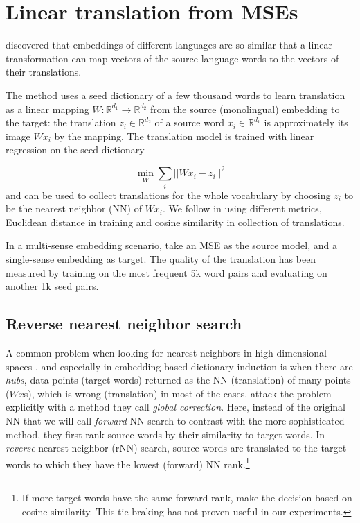 \documentclass[11pt]{article}
\newcommand{\Ro}{\mathbb{R}^{d_1}}
\newcommand{\Rt}{\mathbb{R}^{d_2}}
\begin{document}
\section{Linear translation from MSEs}
\label{sec:linTrans}

 \cite{Mikolov:2013x} discovered that embeddings of different languages are so
 similar that a linear transformation can map vectors of the source language
 words to the vectors of their translations.

The method uses a seed dictionary of a few thousand words to learn translation
as a linear mapping $W: \mathbb{R}^{d_1}\rightarrow \mathbb{R}^{d_2}$ from the
source (monolingual) embedding to the target: the translation $z_i \in \Rt$ of
a source word $x_i \in \Ro$ is approximately its image $Wx_i$ by the mapping.
The translation model is trained with linear regression on the seed dictionary

\[\min_W \sum_i || Wx_i - z_i ||^2 \]
and can be used to collect translations for the whole vocabulary by choosing
$z_i$ to be the nearest neighbor (NN) of $Wx_i$.  We follow
\cite{Mikolov:2013x} in using different metrics, Euclidean distance in training
and cosine similarity in collection of translations.

In a multi-sense embedding scenario, \cite{Borbely:2016} take an MSE as the
source model, and a single-sense embedding as target.  The quality of the
translation has been measured by training on the most frequent 5k word pairs
and evaluating on another 1k seed pairs.

\subsection{Reverse nearest neighbor search}


A common problem when looking for nearest neighbors in high-dimensional spaces
\citep{Radovanovic:2010,Suzuki:2013,Tomasev:2013}, and especially in
embedding-based dictionary induction \citep{Dinu:2015,Lazaridou:2015} is when
there are \emph{hubs}, data points (target words) returned as the NN
(translation) of many points ($Wx$s), which is wrong (translation) in most of
the cases.  \cite{Dinu:2015} attack the problem explicitly with a method they
call \emph{global correction}.  Here, instead of the original NN that we will
call \emph{forward} NN search to contrast with the more sophisticated method,
they first rank source words by their similarity to target words. In
\emph{reverse} nearest neighbor (rNN) search, source words are translated to
the target words to which they have the lowest (forward) NN rank.\footnote{If
more target words have the same forward rank, \cite{Dinu:2015} make the
decision based on cosine similarity. This tie braking has not proven useful in
our experiments.}
\end{document}

